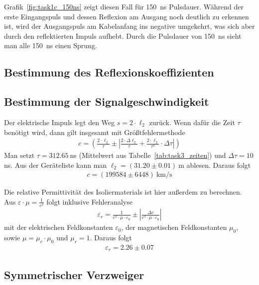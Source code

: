 \documentclass{article}
\begin{document}
Grafik~\ref{fig:task1c_150ns} zeigt diesen Fall für 150~ns Pulsdauer. Während der erste Eingangspuls und dessen Reflexion am Ausgang noch deutlich zu erkennen ist, wird der Ausgangspuls am Kabelanfang ins negative umgekehrt, was sich aber durch den reflektierten Impuls aufhebt. Durch die Pulsdauer von 150~ns sieht man alle 150~ns einen Sprung.

\subsection{Bestimmung des Reflexionskoeffizienten}

\subsection{Bestimmung der Signalgeschwindigkeit}

Der elektrische Impuls legt den Weg $s = 2\cdot \ell_2$ zurück. Wenn dafür die Zeit $\tau$ benötigt wird, dann gilt insgesamt mit Größtfehlermethode
\begin{align*}
c = \left(\frac{2\cdot \ell_2}{\tau} \pm \left|\frac{2\cdot \Delta \ell_2}{\tau} + \frac{2\cdot \ell_2}{\tau^2}\cdot \Delta \tau\right|\right)
\end{align*}
Man setzt $\tau = 312.65~$ns (Mittelwert aus Tabelle~\ref{tab:task3_zeiten}) und $\Delta \tau = 10~$ns. Aus der Geräteliste kann man $\ell_2 = (31.20 \pm 0.01)~$m ablesen. Daraus folgt
\begin{align*}
c = \left(199584 \pm  6448\right)~\text{km/s}
\end{align*}

Die relative Permittivität des Isoliermaterials ist hier außerdem zu berechnen. Aus $\varepsilon \cdot \mu = \frac{1}{c^2}$ folgt inklusive Fehleranalyse
\begin{align*}
\varepsilon_r = \frac{1}{c^2\cdot \mu\cdot \varepsilon_0} \pm \left| \frac{\Delta c}{c^3\cdot \mu\cdot \varepsilon_0} \right|
\end{align*}
mit der elektrischen Feldkonstanten $\varepsilon_0$, der magnetischen Feldkonstanten $\mu_0$, sowie $\mu = \mu_r\cdot\mu_0$ und $\mu_r=1$. Daraus folgt
\begin{align*}
\varepsilon_r = 2.26 \pm 0.07
\end{align*}


\subsection{Symmetrischer Verzweiger}
\end{document}
